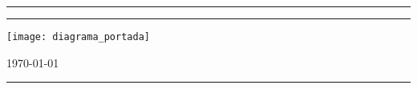 %
%
%
%
%
%
%



\thispagestyle{empty}

\begin{titlepage}
	\centering
	\rule{\textwidth}{1.5pt} 
		{\huge\bfseries		\titulo 	\par}
	\rule{\textwidth}{1.5pt} \par
	\vspace{3cm}
		{\huge	\autor \par}
	\vspace{3cm}	
		{\texttt{[image: diagrama\_portada]} \par}
	\vspace{2.5cm}
		{\huge	\today \par}
	\rule{\textwidth}{1.5pt}
\end{titlepage}

